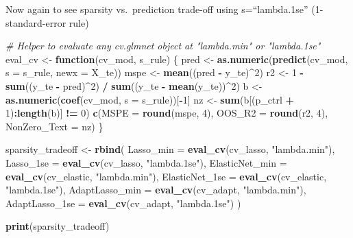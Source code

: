 \documentclass[
]{article}
\newenvironment{Shaded}{\begin{snugshade}}{\end{snugshade}}
\newcommand{\AttributeTok}[1]{\textcolor[rgb]{0.13,0.29,0.53}{#1}}
\newcommand{\CommentTok}[1]{\textcolor[rgb]{0.56,0.35,0.01}{\textit{#1}}}
\newcommand{\ControlFlowTok}[1]{\textcolor[rgb]{0.13,0.29,0.53}{\textbf{#1}}}
\newcommand{\DecValTok}[1]{\textcolor[rgb]{0.00,0.00,0.81}{#1}}
\newcommand{\FunctionTok}[1]{\textcolor[rgb]{0.13,0.29,0.53}{\textbf{#1}}}
\newcommand{\NormalTok}[1]{#1}
\newcommand{\OtherTok}[1]{\textcolor[rgb]{0.56,0.35,0.01}{#1}}
\newcommand{\SpecialCharTok}[1]{\textcolor[rgb]{0.81,0.36,0.00}{\textbf{#1}}}
\newcommand{\StringTok}[1]{\textcolor[rgb]{0.31,0.60,0.02}{#1}}
\begin{document}
Now again to see sparsity vs.~prediction trade-off using
s=``lambda.1se'' (1-standard-error rule)

\begin{Shaded}
\begin{Highlighting}[]
\CommentTok{\# Helper to evaluate any cv.glmnet object at "lambda.min" or "lambda.1se"}
\NormalTok{eval\_cv }\OtherTok{\textless{}{-}} \ControlFlowTok{function}\NormalTok{(cv\_mod, s\_rule) \{}
\NormalTok{  pred }\OtherTok{\textless{}{-}} \FunctionTok{as.numeric}\NormalTok{(}\FunctionTok{predict}\NormalTok{(cv\_mod, }\AttributeTok{s =}\NormalTok{ s\_rule, }\AttributeTok{newx =}\NormalTok{ X\_te))}
\NormalTok{  mspe }\OtherTok{\textless{}{-}} \FunctionTok{mean}\NormalTok{((pred }\SpecialCharTok{{-}}\NormalTok{ y\_te)}\SpecialCharTok{\^{}}\DecValTok{2}\NormalTok{)}
\NormalTok{  r2   }\OtherTok{\textless{}{-}} \DecValTok{1} \SpecialCharTok{{-}} \FunctionTok{sum}\NormalTok{((y\_te }\SpecialCharTok{{-}}\NormalTok{ pred)}\SpecialCharTok{\^{}}\DecValTok{2}\NormalTok{) }\SpecialCharTok{/} \FunctionTok{sum}\NormalTok{((y\_te }\SpecialCharTok{{-}} \FunctionTok{mean}\NormalTok{(y\_te))}\SpecialCharTok{\^{}}\DecValTok{2}\NormalTok{)}
\NormalTok{  b    }\OtherTok{\textless{}{-}} \FunctionTok{as.numeric}\NormalTok{(}\FunctionTok{coef}\NormalTok{(cv\_mod, }\AttributeTok{s =}\NormalTok{ s\_rule))[}\SpecialCharTok{{-}}\DecValTok{1}\NormalTok{]}
\NormalTok{  nz   }\OtherTok{\textless{}{-}} \FunctionTok{sum}\NormalTok{(b[(p\_ctrl }\SpecialCharTok{+} \DecValTok{1}\NormalTok{)}\SpecialCharTok{:}\FunctionTok{length}\NormalTok{(b)] }\SpecialCharTok{!=} \DecValTok{0}\NormalTok{)}
  \FunctionTok{c}\NormalTok{(}\AttributeTok{MSPE =} \FunctionTok{round}\NormalTok{(mspe, }\DecValTok{4}\NormalTok{), }\AttributeTok{OOS\_R2 =} \FunctionTok{round}\NormalTok{(r2, }\DecValTok{4}\NormalTok{), }\AttributeTok{NonZero\_Text =}\NormalTok{ nz)}
\NormalTok{\}}

\NormalTok{sparsity\_tradeoff }\OtherTok{\textless{}{-}} \FunctionTok{rbind}\NormalTok{(}
  \AttributeTok{Lasso\_min      =} \FunctionTok{eval\_cv}\NormalTok{(cv\_lasso,   }\StringTok{"lambda.min"}\NormalTok{),}
  \AttributeTok{Lasso\_1se      =} \FunctionTok{eval\_cv}\NormalTok{(cv\_lasso,   }\StringTok{"lambda.1se"}\NormalTok{),}
  \AttributeTok{ElasticNet\_min =} \FunctionTok{eval\_cv}\NormalTok{(cv\_elastic, }\StringTok{"lambda.min"}\NormalTok{),}
  \AttributeTok{ElasticNet\_1se =} \FunctionTok{eval\_cv}\NormalTok{(cv\_elastic, }\StringTok{"lambda.1se"}\NormalTok{),}
  \AttributeTok{AdaptLasso\_min =} \FunctionTok{eval\_cv}\NormalTok{(cv\_adapt,   }\StringTok{"lambda.min"}\NormalTok{),}
  \AttributeTok{AdaptLasso\_1se =} \FunctionTok{eval\_cv}\NormalTok{(cv\_adapt,   }\StringTok{"lambda.1se"}\NormalTok{)}
\NormalTok{)}

\FunctionTok{print}\NormalTok{(sparsity\_tradeoff)}
\end{Highlighting}
\end{Shaded}
\end{document}

